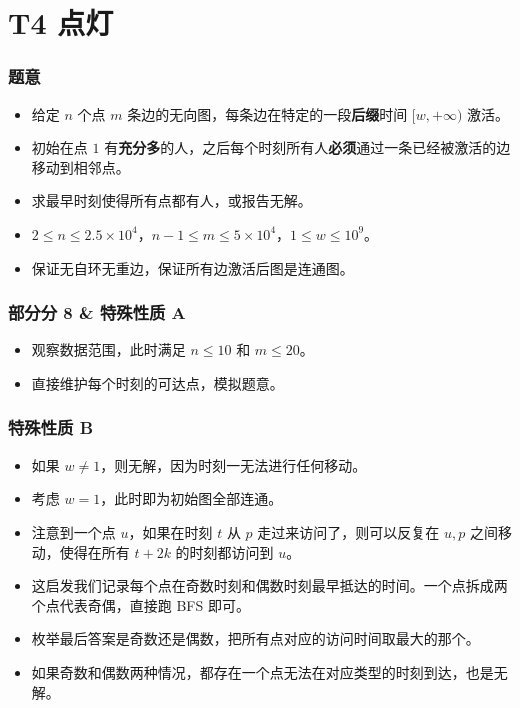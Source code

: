 \documentclass[aspectratio=169]{ctexbeamer}
\begin{document}
\section{T4 点灯}


\begin{frame}
  \frametitle{题意}

  \begin{itemize}
    \item <1 - > 给定 $n$ 个点 $m$ 条边的无向图，每条边在特定的一段\textbf{后缀}时间 $[w,+\infty)$ 激活。
    \item <2 - > 初始在点 $1$ 有\textbf{充分多}的人，之后每个时刻所有人\textbf{必须}通过一条已经被激活的边移动到相邻点。
    \item <3 - > 求最早时刻使得所有点都有人，或报告无解。
    \item <4 - > $2\leq n\leq 2.5\times 10^4$，$n-1\leq m\leq 5\times 10^4$，$1\leq w\leq 10^9$。
    \item <5 - > 保证无自环无重边，保证所有边激活后图是连通图。
  \end{itemize}

\end{frame}

\begin{frame}
  \frametitle{部分分 8 \& 特殊性质 A}

  \begin{itemize}
    \item <1 - > 观察数据范围，此时满足 $n\leq 10$ 和 $m\leq 20$。
    \item <2 - > 直接维护每个时刻的可达点，模拟题意。
  \end{itemize}

\end{frame}

\begin{frame}
  \frametitle{特殊性质 B}

  \begin{itemize}
    \item <1 - > 如果 $w\neq 1$，则无解，因为时刻一无法进行任何移动。
    \item <2 - > 考虑 $w=1$，此时即为初始图全部连通。
    \item <3 - > 注意到一个点 $u$，如果在时刻 $t$ 从 $p$ 走过来访问了，则可以反复在 $u,p$ 之间移动，使得在所有 $t+2k$ 的时刻都访问到 $u$。
    \item <4 - > 这启发我们记录每个点在奇数时刻和偶数时刻最早抵达的时间。一个点拆成两个点代表奇偶，直接跑 BFS 即可。
    \item <5 - > 枚举最后答案是奇数还是偶数，把所有点对应的访问时间取最大的那个。
    \item <6 - > 如果奇数和偶数两种情况，都存在一个点无法在对应类型的时刻到达，也是无解。
  \end{itemize}

\end{frame}
\end{document}
